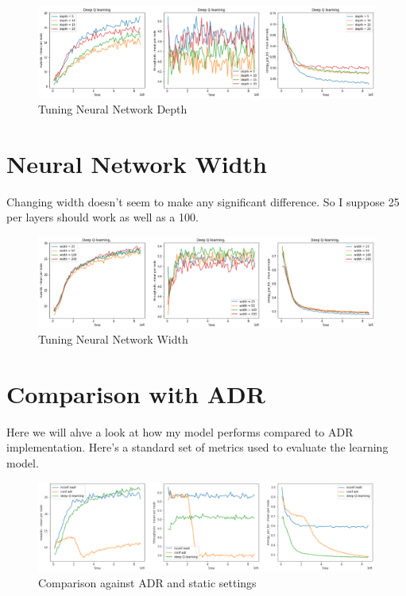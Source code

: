 \begin{figure}[H]
\centering
\hspace*{-1.3cm}  
\includegraphics[scale=0.40]{plots/depth/depth_deep_q_SMALL.png}
  \caption{Tuning Neural Network Depth}
\end{figure}

\section{Neural Network Width}

Changing width doesn't seem to make any significant difference. So I suppose 
25 per layers should work as well as a 100. 

\begin{figure}[H]
\centering
\hspace*{-1.3cm}  
\includegraphics[scale=0.40]{plots/width/width_small.png}
  \caption{Tuning Neural Network Width}
\end{figure}

\section{Comparison with ADR}

Here we will ahve a look at how my model performs
compared to ADR implementation. Here's a standard 
set of metrics used to evaluate the learning model.

\begin{figure}[H]
\centering
\hspace*{-0.5cm}  
\includegraphics[scale=0.40]{plots/adr/adr_inspection_normal_small.PNG}
  \caption{Comparison against ADR and static settings}
  \label{fig:adr_against_deep}
\end{figure}

